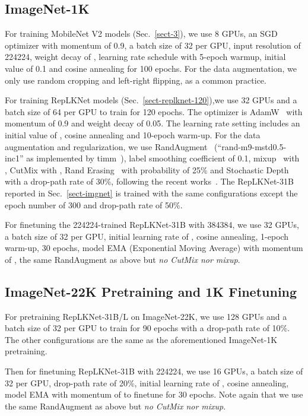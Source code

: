 \documentclass[10pt,twocolumn,letterpaper]{article}
\begin{document}
	\subsection*{ImageNet-1K}
	
	For training MobileNet V2 models (Sec.~\ref{sect-3}), we use 8 GPUs, an SGD optimizer with momentum of 0.9, a batch size of 32 per GPU, input resolution of 224224, weight decay of , learning rate schedule with 5-epoch warmup, initial value of 0.1 and cosine annealing for 100 epochs. For the data augmentation, we only use random cropping and left-right flipping, as a common practice.
	
	For training RepLKNet models (Sec.~\ref{sect-replknet-120}),we use 32 GPUs and a batch size of 64 per GPU to train for 120 epochs. The optimizer is AdamW~\cite{loshchilov2017decoupled} with momentum of 0.9 and weight decay of 0.05. The learning rate setting includes an initial value of , cosine annealing and 10-epoch warm-up. For the data augmentation and regularization, we use RandAugment~\cite{cubuk2020randaugment} (``rand-m9-mstd0.5-inc1'' as implemented by timm~\cite{timm-aa}), label smoothing coefficient of 0.1, mixup~\cite{zhang2017mixup} with , CutMix with , Rand Erasing~\cite{zhong2020random} with probability of 25\% and Stochastic Depth with a drop-path rate of 30\%, following the recent works~\cite{swin,deit,bao2021beit,liu2022convnet}. The RepLKNet-31B reported in Sec.~\ref{sect-imgnet} is trained with the same configurations except the epoch number of 300 and drop-path rate of 50\%.
	
	For finetuning the 224224-trained RepLKNet-31B with 384384, we use 32 GPUs, a batch size of 32 per GPU, initial learning rate of , cosine annealing, 1-epoch warm-up, 30 epochs, model EMA (Exponential Moving Average) with momentum of , the same RandAugment as above but \emph{no CutMix nor mixup}.
	
	
	\subsection*{ImageNet-22K Pretraining and 1K Finetuning}
	
	For pretraining RepLKNet-31B/L on ImageNet-22K, we use 128 GPUs and a batch size of 32 per GPU to train for 90 epochs with a drop-path rate of 10\%. The other configurations are the same as the aforementioned ImageNet-1K pretraining. 
	
	Then for finetuning RepLKNet-31B with 224224, we use 16 GPUs, a batch size of 32 per GPU, drop-path rate of 20\%, initial learning rate of , cosine annealing, model EMA with momentum of  to finetune for 30 epochs. Note again that we use the same RandAugment as above but \emph{no CutMix nor mixup}.
	
\end{document}
